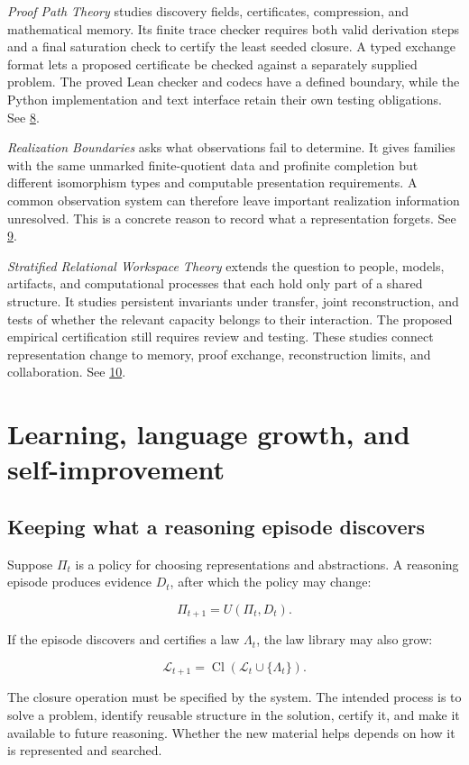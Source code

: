 \documentclass[11pt,oneside,openany]{book}
\begin{document}
\emph{Proof Path Theory} studies discovery fields, certificates, compression, and mathematical memory. Its finite trace checker requires both valid derivation steps and a final saturation check to certify the least seeded closure. A typed exchange format lets a proposed certificate be checked against a separately supplied problem. The proved Lean checker and codecs have a defined boundary, while the Python implementation and text interface retain their own testing obligations. See \hyperlink{reference-8}{8}.

\emph{Realization Boundaries} asks what observations fail to determine. It gives families with the same unmarked finite-quotient data and profinite completion but different isomorphism types and computable presentation requirements. A common observation system can therefore leave important realization information unresolved. This is a concrete reason to record what a representation forgets. See \hyperlink{reference-9}{9}.

\emph{Stratified Relational Workspace Theory} extends the question to people, models, artifacts, and computational processes that each hold only part of a shared structure. It studies persistent invariants under transfer, joint reconstruction, and tests of whether the relevant capacity belongs to their interaction. The proposed empirical certification still requires review and testing. These studies connect representation change to memory, proof exchange, reconstruction limits, and collaboration. See \hyperlink{reference-10}{10}.

\chapter{Learning, language growth, and self-improvement}
\section{Keeping what a reasoning episode discovers}
Suppose \(\Pi_t\) is a policy for choosing representations and abstractions. A reasoning episode produces evidence \(D_t\), after which the policy may change:

\[
\Pi_{t+1}=U(\Pi_t,D_t).
\]

If the episode discovers and certifies a law \(\Lambda_t\), the law library may also grow:

\[
\mathscr L_{t+1}=\operatorname{Cl}(\mathscr L_t\cup\{\Lambda_t\}).
\]

The closure operation must be specified by the system. The intended process is to solve a problem, identify reusable structure in the solution, certify it, and make it available to future reasoning. Whether the new material helps depends on how it is represented and searched.
\end{document}
